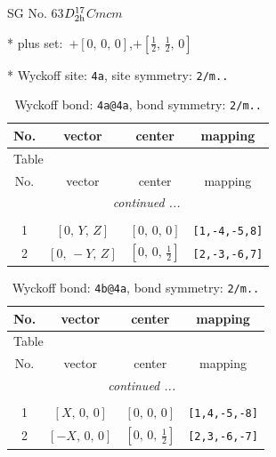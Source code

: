 \documentclass[fleqn,8pt]{jsarticle}
\begin{document}
\setcounter{MaxMatrixCols}{32}

\renewcommand{\tablename}{Table~}
\renewcommand{\figurename}{Figure~}
\begin{center}
\LARGE
SG No. 63\quad$D_{\rm 2h}^{17}$\quad$Cmcm$\quad[ orthorhombic ]
\end{center}

* plus set:\,\,\,$+\left[ 0,\, 0,\, 0 \right]$,\quad $+\left[ \frac{1}{2},\, \frac{1}{2},\, 0 \right]$


* Wyckoff site: {\tt 4a}, site symmetry: {\tt 2/m..}
\renewcommand{\arraystretch}{1.2}
\begin{longtable}{cccc}
\caption{Wyckoff bond: {\tt 4a@4a}, bond symmetry: {\tt 2/m..}}
 \\
 \hline \hline
No. & vector & center & mapping \\ \hline \endfirsthead

\multicolumn{3}{l}{\tablename\ \thetable{}} \\
 \hline \hline
No. & vector & center & mapping \\ \hline \endhead

 \hline \hline
\multicolumn{3}{r}{\footnotesize\it continued ...} \\ \endfoot

 \hline \hline
\multicolumn{3}{r}{} \\ \endlastfoot

1 & $\left[ 0,\, Y,\, Z \right]$ & $\left[ 0,\, 0,\, 0 \right]$ & {\tt [1,-4,-5,8]} \\ \hline
2 & $\left[ 0,\, - Y,\, Z \right]$ & $\left[ 0,\, 0,\, \frac{1}{2} \right]$ & {\tt [2,-3,-6,7]} \\
\end{longtable}
\renewcommand{\arraystretch}{1.2}
\begin{longtable}{cccc}
\caption{Wyckoff bond: {\tt 4b@4a}, bond symmetry: {\tt 2/m..}}
 \\
 \hline \hline
No. & vector & center & mapping \\ \hline \endfirsthead

\multicolumn{3}{l}{\tablename\ \thetable{}} \\
 \hline \hline
No. & vector & center & mapping \\ \hline \endhead

 \hline \hline
\multicolumn{3}{r}{\footnotesize\it continued ...} \\ \endfoot

 \hline \hline
\multicolumn{3}{r}{} \\ \endlastfoot

1 & $\left[ X,\, 0,\, 0 \right]$ & $\left[ 0,\, 0,\, 0 \right]$ & {\tt [1,4,-5,-8]} \\ \hline
2 & $\left[ - X,\, 0,\, 0 \right]$ & $\left[ 0,\, 0,\, \frac{1}{2} \right]$ & {\tt [2,3,-6,-7]} \\
\end{longtable}
\end{document}
